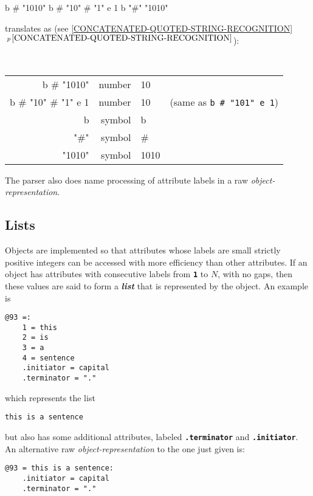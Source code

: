 \documentclass[12pt]{article}
\newcommand{\TT}[1]{{\tt \bfseries #1}}
\newcommand{\key}[1]{{\bf \em #1}\index{#1}}
\newcommand{\secref}[1]{\ref{#1}$\,^{p\,\pageref{#1}}$}
\newenvironment{indpar}[1][0.3in]%
	{\begin{list}{}%
		     {\setlength{\itemsep}{0in}%
		      \setlength{\topsep}{0in}%
		      \setlength{\parsep}{1ex}%
		      \setlength{\labelwidth}{#1}%
		      \setlength{\leftmargin}{#1}%
		      \addtolength{\leftmargin}{\labelsep}}%
	 \item}%
	{\end{list}}
\begin{document}
\begin{center}
b \# "1010" b \# "10" \# "1" e 1 b "\#" "1010"
\end{center}
translates as (see \secref{CONCATENATED-QUOTED-STRING-RECOGNITION}):
\begin{center}
\tt
\begin{tabular}{r@{~~$\Longrightarrow$~~}rll}
b \# "1010"		& \rm number & 10 \\
b \# "10" \# "1" e 1	& \rm number & 10
			& \rm (same as {\tt b \# "101" e 1}) \\
b			& \rm symbol & b \\		
"\#"			& \rm symbol & \# \\		
"1010"			& \rm symbol & 1010 \\		
\end{tabular}
\end{center}


The parser also does name processing of attribute labels in a raw
{\em object-representation}.

\subsection{Lists}

Objects are implemented so that attributes whose labels are small
strictly positive integers can be accessed with more efficiency
than other attributes.  If an object has attributes with consecutive
labels from \TT{1} to $N$, with no gaps,
then these values are said to form a \key{list} that is represented
by the object.  An example is

\begin{indpar}\begin{verbatim}
@93 =:
    1 = this
    2 = is
    3 = a
    4 = sentence
    .initiator = capital
    .terminator = "."
\end{verbatim}\end{indpar}

which represents the list
\begin{indpar}
\verb|this is a sentence|
\end{indpar}

but also has some additional attributes, labeled \TT{.terminator}
and \TT{.initiator}.  An alternative raw {\em object-representation}
to the one just given is:

\begin{indpar}\begin{verbatim}
@93 = this is a sentence:
    .initiator = capital
    .terminator = "."
\end{verbatim}\end{indpar}
\end{document}

